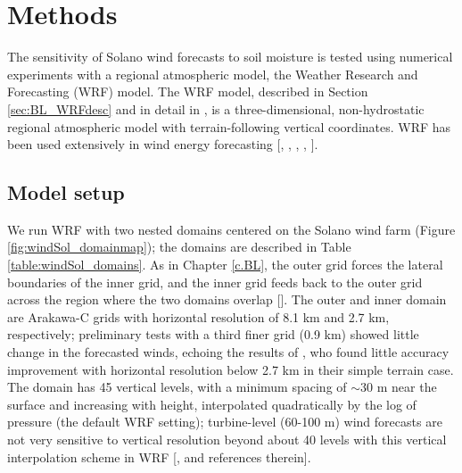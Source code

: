 
%
%
%
%
%

\section{Methods}

The sensitivity of Solano wind forecasts to soil moisture is tested using numerical experiments with a regional atmospheric model, the Weather Research and Forecasting (WRF) model.  The WRF model, described in Section \ref{sec:BL_WRFdesc} and in detail in \cite{skamarock2008}, is a three-dimensional, non-hydrostatic regional atmospheric model with terrain-following vertical coordinates. WRF has been used extensively in wind energy forecasting [\cite{marjanovic2014}, \cite{wharton2011review}, \cite{carvalho2012sensitivity}, \cite{deppe2013wrf}, \cite{foley2012current}].

\subsection{Model setup}

We run WRF with two nested domains centered on the Solano wind farm (Figure \ref{fig:windSol_domainmap}); the domains are described in Table \ref{table:windSol_domains}.  As in Chapter \ref{c.BL}, the outer grid forces the lateral boundaries of the inner grid, and the inner grid feeds back to the outer grid across the region where the two domains overlap [\cite{skamarock2008}].  The outer and inner domain are Arakawa-C grids with horizontal resolution of 8.1 km and 2.7 km, respectively; preliminary tests with a third finer grid (0.9 km) showed little change in the forecasted winds, echoing the results of \cite{marjanovic2014}, who found little accuracy improvement with horizontal resolution below 2.7 km in their simple terrain case.  The domain has 45 vertical levels, with a minimum spacing of $\sim$30 m near the surface and increasing with height, interpolated quadratically by the log of pressure (the default WRF setting); turbine-level (60-100 m) wind forecasts are not very sensitive to vertical resolution beyond about 40 levels with this vertical interpolation scheme in WRF [\cite{marjanovic2014}, and references therein].

